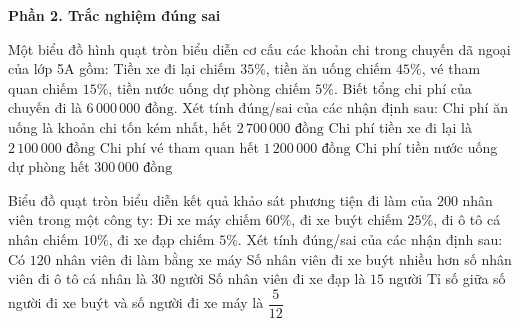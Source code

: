 \textbf{Phần 2. Trắc nghiệm đúng sai}

\begin{ex} %
Một biểu đồ hình quạt tròn biểu diễn cơ cấu các khoản chi trong chuyến dã ngoại của lớp 5A gồm: Tiền xe đi lại chiếm $35\%$, tiền ăn uống chiếm $45\%$, vé tham quan chiếm $15\%$, tiền nước uống dự phòng chiếm $5\%$. Biết tổng chi phí của chuyến đi là $6\,000\,000\text{ đồng}$. Xét tính đúng/sai của các nhận định sau:
\choiceTF
{\True Chi phí ăn uống là khoản chi tốn kém nhất, hết $2\,700\,000\text{ đồng}$}
{\True Chi phí tiền xe đi lại là $2\,100\,000\text{ đồng}$}
{Chi phí vé tham quan hết $1\,200\,000\text{ đồng}$}
{\True Chi phí tiền nước uống dự phòng hết $300\,000\text{ đồng}$}
\end{ex}

\begin{ex} %
Biểu đồ quạt tròn biểu diễn kết quả khảo sát phương tiện đi làm của $200$ nhân viên trong một công ty: Đi xe máy chiếm $60\%$, đi xe buýt chiếm $25\%$, đi ô tô cá nhân chiếm $10\%$, đi xe đạp chiếm $5\%$. Xét tính đúng/sai của các nhận định sau:
\choiceTF
{\True Có $120$ nhân viên đi làm bằng xe máy}
{\True Số nhân viên đi xe buýt nhiều hơn số nhân viên đi ô tô cá nhân là $30$ người}
{Số nhân viên đi xe đạp là $15$ người}
{\True Tỉ số giữa số người đi xe buýt và số người đi xe máy là $\dfrac{5}{12}$}
\end{ex}

